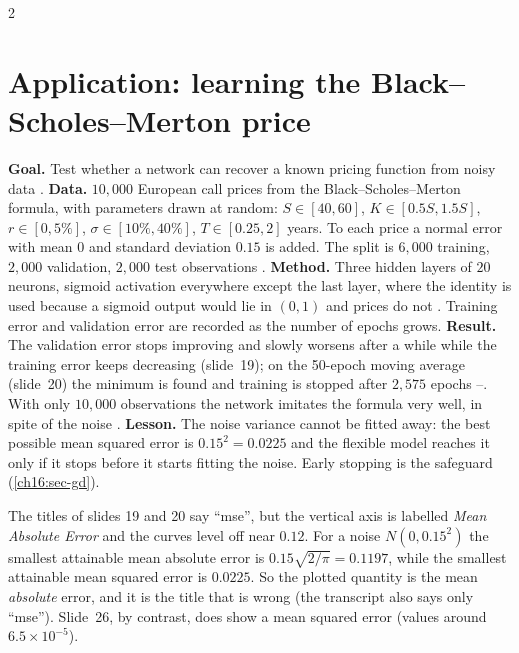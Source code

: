 \begin{paracol}{2}
\section{Application: learning the Black--Scholes--Merton price}\label{ch16:sec-bsm}
\begin{casestudy}
\textbf{Goal.} Test whether a network can recover a known pricing function from noisy data .
\textbf{Data.} $10{,}000$ European call prices from the Black--Scholes--Merton formula, with parameters drawn at random: $S\in[40,60]$, $K\in[0.5S,1.5S]$, $r\in[0,5\%]$, $\sigma\in[10\%,40\%]$, $T\in[0.25,2]$ years. To each price a
normal error with mean $0$ and standard deviation $0.15$ is added. The split is $6{,}000$ training, $2{,}000$ validation, $2{,}000$ test observations .
\textbf{Method.} Three hidden layers of $20$ neurons, sigmoid activation everywhere except the last layer, where the identity is used because a sigmoid output would lie in $(0,1)$ and prices do not . Training error and validation error are recorded as the number of epochs grows.
\textbf{Result.} The validation error stops improving and slowly worsens after a while while the training error keeps decreasing (slide~19); on the 50-epoch moving average (slide~20) the minimum is found and training is stopped after $2{,}575$ epochs
--. With only $10{,}000$ observations the network imitates the formula very well, in spite of the noise .
\textbf{Lesson.} The noise variance cannot be fitted away: the best possible mean squared error is $0.15^2=0.0225$ and the flexible model reaches it only if it stops before it starts fitting the noise. Early stopping is the safeguard (\cref{ch16:sec-gd}).
\end{casestudy}

\begin{coursenote}
The titles of slides 19 and 20 say ``mse'', but the vertical axis is labelled \emph{Mean Absolute Error} and the curves level off near $0.12$. For a noise $N(0,0.15^2)$ the smallest attainable mean absolute error is $0.15\sqrt{2/\pi}=0.1197$, while the smallest
attainable mean squared error is $0.0225$. So the plotted quantity is the mean \emph{absolute} error, and it is the title that is wrong (the transcript also says only ``mse''). Slide~26, by contrast, does show a mean squared error (values around $6.5\times10^{-5}$).
\end{coursenote}


\end{paracol}
